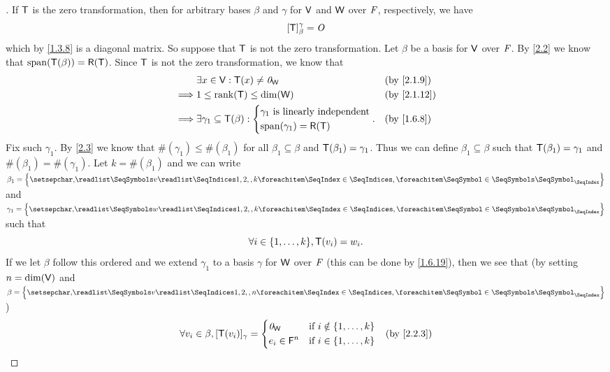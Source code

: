 \begin{proof}[]
	If \(\mathsf{T}\) is the zero transformation, then for arbitrary bases \(\beta\) and \(\gamma\) for \(\mathsf{V}\) and \(\mathsf{W}\) over \(\mathit{F}\), respectively, we have
	\[
		[\mathsf{T}]_{\beta}^{\gamma} = \mathit{O}
	\]
	which by \cref{1.3.8} is a diagonal matrix.
	So suppose that \(\mathsf{T}\) is not the zero transformation.
	Let \(\beta\) be a basis for \(\mathsf{V}\) over \(\mathit{F}\).
	By \cref{2.2} we know that \(\spn{\T(\beta)} = \rg{\T}\).
	Since \(\mathsf{T}\) is not the zero transformation, we know that
	\begin{align*}
		         & \exists x \in \V : \T(x) \neq \zv_{\W}                &  & \by{2.1.9}           \\
		\implies & 1 \leq \rk{\T} \leq \dim(\W)                          &  & \by{2.1.12}          \\
		\implies & \exists \gamma_1 \subseteq \T(\beta) : \begin{dcases}
			                                                  \gamma_1 \text{ is linearly independent} \\
			                                                  \spn{\gamma_1} = \rg{\T}
		                                                  \end{dcases}. &  & \by{1.6.8}
	\end{align*}
	Fix such \(\gamma_1\).
	By \cref{2.3} we know that \(\#(\gamma_1) \leq \#(\beta_1)\) for all \(\beta_1 \subseteq \beta\) and \(\mathsf{T}(\beta_1) = \gamma_1\).
	Thus we can define \(\beta_1 \subseteq \beta\) such that \(\mathsf{T}(\beta_1) = \gamma_1\) and \(\#(\beta_1) = \#(\gamma_1)\).
	Let \(k = \#(\beta_1)\) and we can write \(\beta_1 = \set{\seq{v}{1,2,,k}}\) and \(\gamma_1 = \set{\seq{w}{1,2,,k}}\) such that
	\[
		\forall i \in \set{1, \dots, k}, \T(v_i) = w_i.
	\]
	If we let \(\beta\) follow this ordered and we extend \(\gamma_1\) to a basis \(\gamma\) for \(\mathsf{W}\) over \(\mathit{F}\) (this can be done by \cref{1.6.19}), then we see that (by setting \(n = \dim(\mathsf{V})\) and \(\beta = \set{\seq{v}{1,2,,n}}\))
	\begin{align*}
		         & \forall v_i \in \beta, [\T(v_i)]_{\gamma} = \begin{dcases}
			                                                       \zv_{\W}           & \text{if } i \notin \set{1, \dots, k} \\
			                                                       e_i \in \vs{F}^{n} & \text{if } i \in \set{1, \dots, k}
		                                                       \end{dcases}   &  & \by{2.2.3} \\

\end{align*}
\end{proof}
